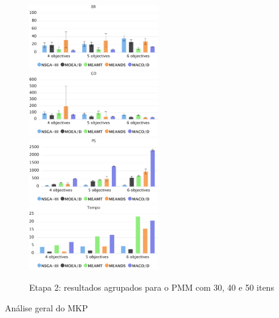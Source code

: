 \begin{figure}[!htbp]
	\caption{Etapa 2: resultados agrupados para o PMM com 30, 40 e 50 itens}
	\label{fig_exp2_mkp_todos}
	\includegraphics[width=0.5\textwidth]{cap_experimentos/figs/etapa2/er-mkp-todos}
	\includegraphics[width=0.5\textwidth]{cap_experimentos/figs/etapa2/gd-mkp-todos}
	\includegraphics[width=0.5\textwidth]{cap_experimentos/figs/etapa2/ps-mkp-todos}
	\includegraphics[width=0.5\textwidth]{cap_experimentos/figs/etapa2/time-mkp-todos}
\end{figure}

Análise geral do MKP


